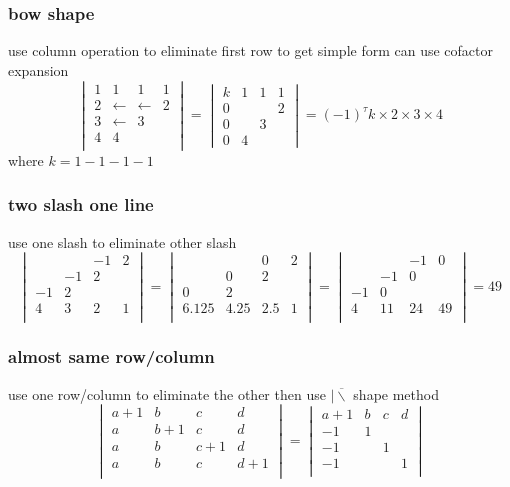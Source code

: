 \documentclass{overview}
\begin{document}
\subsubsection{bow shape}
use column operation to eliminate first row to get simple form can use cofactor expansion
\[
\begin{vmatrix}
	1 & 1 & 1 & 1 \\
	2 & \leftarrow &\leftarrow  & 2 \\
	3 & \leftarrow & 3 &  \\
	4 & 4 &  &  \\
\end{vmatrix}
=
\begin{vmatrix}
	k & 1 & 1 & 1 \\
	0 &  &  & 2 \\
	0 &  & 3&  \\
	0 & 4 &  &  
\end{vmatrix} = (-1)^{\tau} k \times 2 \times 3 \times 4
\] 
where $k=1-1-1-1$

\subsubsection{two slash one line}

use one slash to eliminate other slash
\[
\begin{vmatrix}
	 &  & -1 & 2 \\
	 & -1 & 2 &  \\
	-1 & 2 &  &  \\
	4 & 3 & 2 & 1 \\
\end{vmatrix}
=
\begin{vmatrix}
	 &  & 0 & 2 \\
	 & 0 & 2 &  \\
	0 & 2 &  &  \\
	6.125 & 4.25 & 2.5 & 1 \\
\end{vmatrix}
=
\begin{vmatrix}
	 &  & -1 & 0 \\
	 & -1 & 0 &  \\
	-1 & 0 &  &  \\
	4 & 11 & 24 & 49 \\
\end{vmatrix}
= 49
\] 
\subsubsection{almost same row/column}
use one row/column to eliminate the other
then use $|\overline\backslash$ shape method
\[
	\begin{vmatrix}
		a+1 & b & c & d \\
		a & b+1 & c & d \\
		a & b & c+1 & d \\
		a & b & c & d+1 \\
	\end{vmatrix}
	=
	\begin{vmatrix}
		a+1 & b & c & d \\
		-1 & 1 &  &  \\
		-1 &  & 1 &  \\
		-1 &  &  & 1 \\
	\end{vmatrix}
\] 
\end{document}
